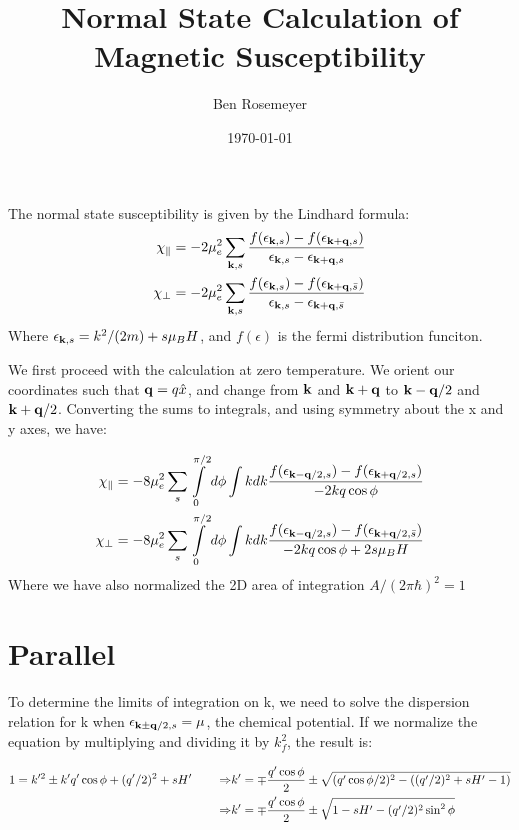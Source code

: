 \documentclass{article}
\begin{document}
\title{Normal State Calculation of Magnetic Susceptibility}
\author{Ben Rosemeyer}
\date{\today}
\maketitle

The normal state susceptibility is given by the Lindhard formula:
\begin{align*}
\chi_{\parallel}=-2\mu_e^2\sum\limits_{{\bf k},s} \frac{ f(\epsilon_{{\bf k},s})-f(\epsilon_{{\bf k+q},s})}{ \epsilon_{{\bf k},s}-\epsilon_{{\bf k+q},s}} \\
\chi_{\perp}=-2\mu_e^2\sum\limits_{{\bf k},s} \frac{ f(\epsilon_{{\bf k},s})-f(\epsilon_{{\bf k+q},\bar{s}})}{ \epsilon_{{\bf k},s}-\epsilon_{{\bf k+q},\bar{s}}}
\end{align*}
Where $\epsilon_{{\bf k},s}=k^2/(2m)+s\mu_B H$, and $f(\epsilon)$ is the fermi distribution funciton.
 
 We first proceed with the calculation at zero temperature. We orient our coordinates such that ${\bf q}=q\hat{x}$, and change from ${\bf k}$ and ${\bf k+q}$ to ${\bf k-q}/2$ and ${\bf k+q}/2$. Converting the sums to integrals, and using symmetry about the x and y axes, we have:
 
 \begin{align*}
 \chi_\parallel=-8\mu_e^2\sum\limits_s \int\limits_0^{\pi/2} d\phi \int k dk  \frac{ f(\epsilon_{{\bf k-q}/2,s})-f(\epsilon_{{\bf k+q}/2,s})}{ -2kq\cos\phi} \\
  \chi_\perp=-8\mu_e^2\sum\limits_s \int\limits_0^{\pi/2} d\phi \int k dk  \frac{ f(\epsilon_{{\bf k-q}/2,s})-f(\epsilon_{{\bf k+q}/2,\bar{s}})}{ -2kq\cos\phi+2s\mu_B H}
 \end{align*}
 Where we have also normalized the 2D area of integration $A/(2\pi \hbar)^2=1$
 
 \section{Parallel}
 To determine the limits of integration on k, we need to solve the dispersion relation for k when $\epsilon_{{\bf k\pm q}/2,s}=\mu$, the chemical potential. If we normalize the equation by multiplying and dividing it by $k_f^2$, the result is:
 
 \begin{align*}
 1=k'^2\pm k'q'\cos\phi+(q'/2)^2+sH'\quad\quad\Rightarrow &k'=\mp \frac{q'\cos\phi}{2} \pm\sqrt{ (q'\cos\phi/2)^2-((q'/2)^2 +sH'-1)} \\
 {\bf \Rightarrow}&k'=\mp \frac{q'\cos\phi}{2} \pm\sqrt{1-sH'-(q'/2)^2\sin^2\phi}
 \end{align*}
 
\end{document}
